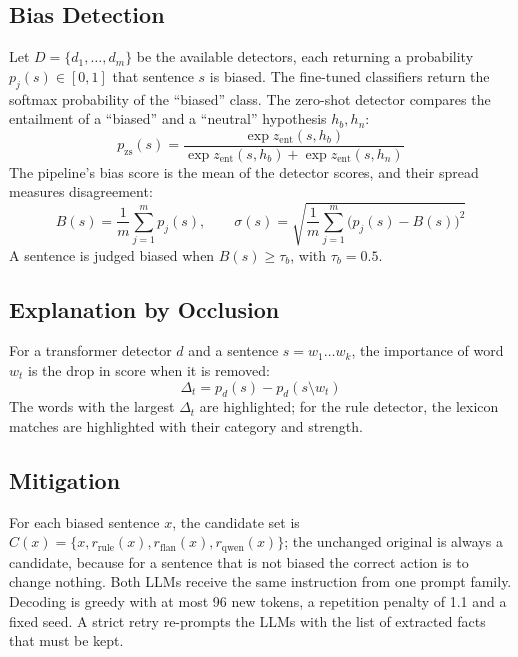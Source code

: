 \documentclass[12pt,a4paper,oneside]{report}
\begin{document}
\subsection{Bias Detection}
Let $D=\{d_1,\dots,d_m\}$ be the available detectors, each returning a probability $p_j(s)\in[0,1]$ that sentence $s$ is
biased. The fine-tuned classifiers return the softmax probability of the ``biased'' class. The zero-shot detector
compares the entailment of a ``biased'' and a ``neutral'' hypothesis $h_b,h_n$:
\begin{equation}
p_{\text{zs}}(s)=\frac{\exp z_{\text{ent}}(s,h_b)}{\exp z_{\text{ent}}(s,h_b)+\exp z_{\text{ent}}(s,h_n)}
\end{equation}
The pipeline's bias score is the mean of the detector scores, and their spread measures disagreement:
\begin{equation}
B(s)=\frac{1}{m}\sum_{j=1}^{m}p_j(s),\qquad \sigma(s)=\sqrt{\frac{1}{m}\sum_{j=1}^{m}\big(p_j(s)-B(s)\big)^2}
\end{equation}
A sentence is judged biased when $B(s)\ge\tau_b$, with $\tau_b=0.5$.

\subsection{Explanation by Occlusion}
For a transformer detector $d$ and a sentence $s=w_1\dots w_k$, the importance of word $w_t$ is the drop in score when
it is removed:
\begin{equation}
\Delta_t = p_d(s) - p_d(s\setminus w_t)
\end{equation}
The words with the largest $\Delta_t$ are highlighted; for the rule detector, the lexicon matches are highlighted with
their category and strength.

\subsection{Mitigation}
For each biased sentence $x$, the candidate set is $C(x)=\{x, r_{\text{rule}}(x), r_{\text{flan}}(x),
r_{\text{qwen}}(x)\}$; the unchanged original is always a candidate, because for a sentence that is not biased the
correct action is to change nothing. Both LLMs receive the same instruction from one prompt family. Decoding is greedy
with at most 96 new tokens, a repetition penalty of 1.1 and a fixed seed. A strict retry re-prompts the LLMs with the
list of extracted facts that must be kept.
\end{document}

